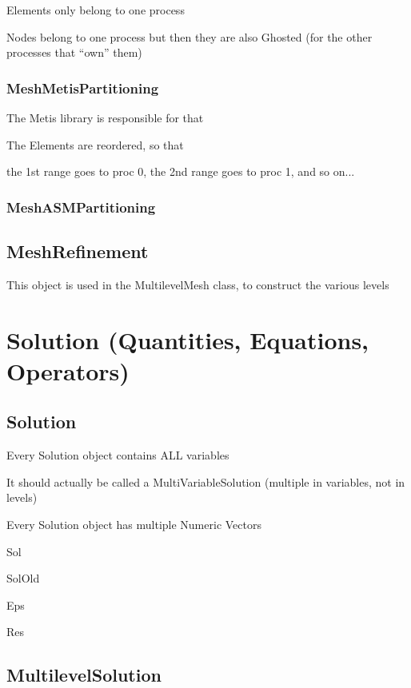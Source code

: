 \documentclass[10pt]{book}
\begin{document}
 Elements only belong to one process
 
 Nodes belong to one process but then they are also Ghosted (for the other processes that ``own'' them)
 
    \subsection{MeshMetisPartitioning}

  The Metis library is responsible for that

  
  The Elements are reordered, so that 
  
  the 1st range goes to proc 0, the 2nd range goes to proc 1, and so on...
  
  
    \subsection{MeshASMPartitioning}
  

  
  \section{MeshRefinement}

   
    This object is used in the MultilevelMesh class, to construct the various levels
  
  
  \chapter{Solution (Quantities, Equations, Operators)}

  \section{Solution}
  
  Every Solution object contains ALL variables
  
  It should actually be called a MultiVariableSolution (multiple in variables, not in levels)
  
  
  Every Solution object has multiple Numeric Vectors 
  
  Sol 
  
  SolOld
  
  Eps
  
  Res
  
  
  
  \section{MultilevelSolution}
   
\end{document}
